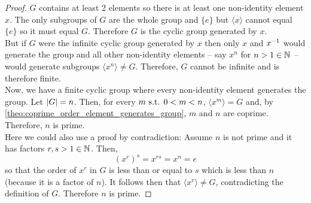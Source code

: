 \documentclass[MathsNotesBase.tex]{subfiles}
\begin{document}
{		
		\begin{proof}
			$G$ contains at least 2 elements so there is at least one non-identity element $x$. The only subgroups of $G$ are the whole group and ${ \{e\} }$ but ${ \langle x \rangle  }$ cannot equal ${ \{e\} }$ so it must equal $G$. Therefore $G$ is the cyclic group generated by $x$.\\
			But if $G$ were the infinite cyclic group generated by $x$ then only $x$ and ${x}^{-1}$ would generate the group and all other non-identity elements -- say $x^n$ for ${ n > 1 \in \mathbb{N}^{} }$ -- would generate subgroups ${ \langle x^n \rangle \neq G }$. Therefore, $G$ cannot be infinite and is therefore finite.\\
			Now, we have a finite cyclic group where every non-identity element generates the group. Let ${ \left\lvert G\right\rvert = n }$. Then, for every ${ m \text{ s.t. } 0 < m < n }$, ${ \langle x^m \rangle = G }$ and, by \autoref{theo:coprime_order_element_generates_group}, $m$ and $n$ are coprime. Therefore, $n$ is prime.\\
			Here we could also use a proof by contradiction: Assume $n$ is not prime and it has factors ${ r,s > 1 \in \mathbb{N}^{} }$. Then,
			\[ (x^r)^s = x^{rs} = x^n = e \]
			so that the order of $x^r$ in $G$ is less than or equal to $s$ which is less than $n$ (because it is a factor of $n$). It follows then that ${ \langle x^r \rangle \neq G }$, contradicting the definition of $G$. Therefore $n$ is prime.
		\end{proof}
	
		\bigskip
}
\end{document}
